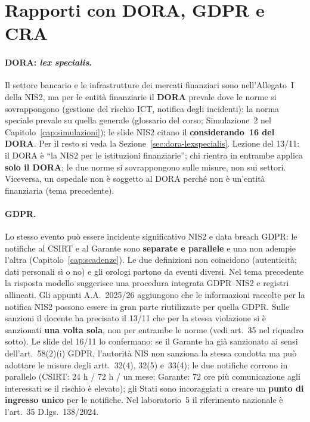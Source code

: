 \section{Rapporti con DORA, GDPR e CRA}
\label{sec:nis2-rapporti}

\paragraph{DORA: \emph{lex specialis}.} Il settore bancario e le infrastrutture dei mercati finanziari
sono nell'Allegato~I della NIS2, ma per le entità finanziarie il \textbf{DORA} prevale dove le norme
si sovrappongono (gestione del rischio ICT, notifica degli incidenti): la norma speciale prevale su
quella generale (glossario del corso; Simulazione~2 nel Capitolo~\ref{cap:simulazioni}); le slide NIS2
citano il \textbf{considerando~16 del DORA}. Per il resto
si veda la Sezione~\ref{sec:dora-lexspecialis}. Lezione del 13/11: il DORA è ``la NIS2 per le
istituzioni finanziarie''; chi rientra in entrambe applica \textbf{solo il DORA}; le due norme si
sovrappongono sulle misure, non sui settori. Viceversa, un ospedale non è soggetto al DORA perché
non è un'entità finanziaria (tema precedente).

\paragraph{GDPR.} Lo stesso evento può essere incidente significativo NIS2 e data breach GDPR: le
notifiche al CSIRT e al Garante sono \textbf{separate e parallele} e una non adempie l'altra
(Capitolo~\ref{cap:scadenze}). Le due definizioni non coincidono (autenticità; dati personali sì o no) e
gli orologi partono da eventi diversi. Nel tema precedente la risposta modello suggerisce una procedura
integrata GDPR--NIS2 e registri allineati. Gli appunti A.A.~2025/26 aggiungono che le informazioni
raccolte per la notifica NIS2 possono essere in gran parte riutilizzate per quella GDPR. Sulle sanzioni
il docente ha precisato il 13/11 che per la stessa violazione si è sanzionati \textbf{una volta sola},
non per entrambe le norme (vedi art.~35 nel riquadro sotto). Le slide del 16/11 lo confermano: se il
Garante ha già sanzionato ai sensi dell'art.~58(2)(i) GDPR, l'autorità NIS non sanziona la stessa
condotta ma può adottare le misure degli artt.~32(4), 32(5) e~33(4); le due notifiche corrono in
parallelo (CSIRT: 24 h / 72 h / un mese; Garante: 72 ore più comunicazione agli interessati se il rischio
è elevato); gli Stati sono incoraggiati a creare un \textbf{punto di ingresso unico} per le notifiche.
Nel laboratorio~5 il riferimento nazionale è l'art.~35 D.lgs.~138/2024.

